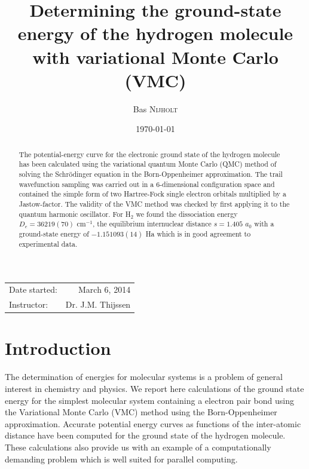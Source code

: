 \documentclass{article}
\title{Determining the ground-state energy of the hydrogen molecule with variational Monte Carlo (VMC)} %
\author{Bas \textsc{Nijholt}} %
\date{\today} %
\begin{document}
\maketitle %

\begin{center}
\begin{tabular}{l r}
Date started: & March 6, 2014 \\ 
Instructor: & Dr. J.M. Thijssen
\end{tabular}
\end{center}

\begin{abstract}
The potential-energy curve for the electronic ground state of the hydrogen molecule has been calculated using the variational quantum Monte Carlo (QMC) method of solving the Schr\"odinger equation in the Born-Oppenheimer approximation. The trail wavefunction sampling was carried out in a 6-dimensional configuration space and contained the simple form of two Hartree-Fock single electron orbitals multiplied by a Jastow-factor. The validity of the VMC method was checked by first applying it to the quantum harmonic oscillator. For H$_2$ we found the dissociation energy $D_e = 36 219(70)$ cm$^{-1}$, the equilibrium internuclear distance $s=1.405$ $a_0$ with a ground-state energy of $-1.151093(14)$ Ha which is in good agreement to experimental data.
\end{abstract}


\section{Introduction}
The determination of energies for molecular systems is a problem of general interest in chemistry and physics. We report here calculations of the ground state energy for the simplest molecular system containing a electron pair bond using the Variational Monte Carlo (VMC) method using the Born-Oppenheimer approximation. Accurate potential energy curves as functions of the inter-atomic distance have been computed for the ground state of the hydrogen molecule. \\

These calculations also provide us with an example of a computationally demanding problem which is well suited for parallel computing.\\ 
\end{document}
